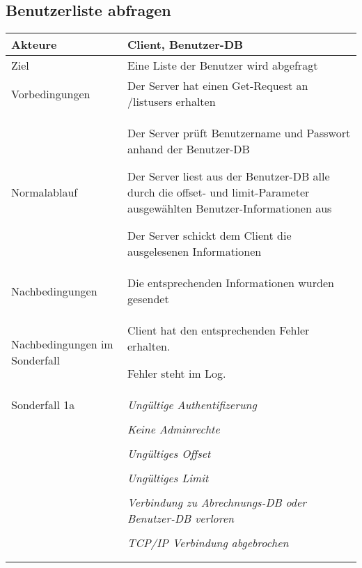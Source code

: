 \documentclass[a4paper,10pt,titlepage,parskip=true]{article}
\makeatletter
\newcommand\novspace{\@minipagetrue}
\newenvironment{owncompactitem}{%
\compactitem
}{%
\@finalstrut\@arstrutbox
\@nameuse{endcompactitem}%
\aftergroup\let\aftergroup\@finalstrut\aftergroup\@gobble
}
\newenvironment{owncompactenum}{%
\compactenum
}{%
\@finalstrut\@arstrutbox
\@nameuse{endcompactenum}%
\aftergroup\let\aftergroup\@finalstrut\aftergroup\@gobble
}
\newcommand{\usecase}[7]
{\subsection{#1}
\setlength{\extrarowheight}{2pt}
\begin{tabular}{|p{0.2\textwidth}|p{0.9\textwidth}|}
\hline
  Akteure & #2\\\hline
  Ziel & #3\\\hline
  Vorbedingungen & \novspace
  	\begin{owncompactitem}[-] #4 \end{owncompactitem} \\\hline
  Normalablauf & \vspace{-7pt}
  	\begin{owncompactenum}[1.] #6 \end{owncompactenum} \\\hline
  Nachbedingungen & \novspace
  	\begin{owncompactitem}[-] #5 \end{owncompactitem} \\\hline
  #7
\end{tabular}
}
\newcommand{\sonderfall}[4][\empty]
{
Sonderfall #2 & \vspace{-10pt}
	\textit{#3}
	\begin{owncompactenum}[{#2}.1] {#4} \end{owncompactenum}
  	\ifthenelse{\equal{#1}{\empty}}
    	{\\\hline} %
    	{\ensuremath{\rightarrow} #1 \\ [+1pt] \hline} %

}
\newcommand{\sondernachbedingung}[1]
{
Nachbedingungen im Sonderfall& \novspace
	\begin{owncompactitem}[-]
		#1
	\end{owncompactitem} \\\hline
}
\makeatother
\begin{document}
\usecase{Benutzerliste abfragen}{Client, Benutzer-DB}%
{Eine Liste der Benutzer wird abgefragt}%
{%
  \item Der Server hat einen Get-Request an /listusers erhalten
}
{%
  \item Die entsprechenden Informationen wurden gesendet
}
{%
  \item Der Server prüft Benutzername und Passwort anhand der Benutzer-DB
  \item Der Server liest aus der Benutzer-DB alle durch die offset- und limit-Parameter ausgewählten Benutzer-Informationen aus
  \item Der Server schickt dem Client die ausgelesenen Informationen
}
{%
  \sondernachbedingung{
	\item Client hat den entsprechenden Fehler erhalten.
	\item Fehler steht im Log.
	}
		\sonderfall[Weiter mit normalem Betrieb]{1a}
    {Ungültige Authentifizerung}
    {
    \item Fehler wird ins Log geschrieben
  	\item Der Client erhält einen EAUTH Fehler mit HTTP-Status 401 Unauthorized
    }
     	\sonderfall[Weiter mit normalem Betrieb]{1b}
    {Keine Adminrechte}
    {
    \item Fehler wird ins Log geschrieben
  	\item Der Client erhält einen ENOTADMIN Fehler mit HTTP-Status 403 Forbidden
    }
	\sonderfall[Weiter mit normalem Betrieb]{2a}%
	{Ungültiges Offset}%
  	{
	\item Der Fehler wird ins Log geschrieben
	\item Der Client erhält einen EOFFSET Fehler mit HTTP-Status 403 Forbidden
  	}
	\sonderfall[Weiter mit normalem Betrieb]{2b}%
	{Ungültiges Limit}%
  	{
	\item Der Fehler wird ins Log geschrieben
	\item Der Client erhält einen ELIMIT Fehler mit HTTP-Status 403 Forbidden
  	}
  	    
  \sonderfall[Der Server nimmt keine weiteren Anfragen an bis Verbindung zur Datenbank wieder hergestellt.]{*}%
	{Verbindung zu Abrechnungs-DB oder Benutzer-DB verloren}%
  	{
	\item Der Fehler wird ins Log geschrieben
	\item Der Client erhält einen EDATABASE Fehler mit HTTP-Status 503 Service Unavailable
  	}

\sonderfall[Weiter mit normalem Betrieb]{**}%
	{TCP/IP Verbindung abgebrochen}%
	{
	\item Fehlermeldung wird ins Log geschrieben
	}
}
\end{document}
